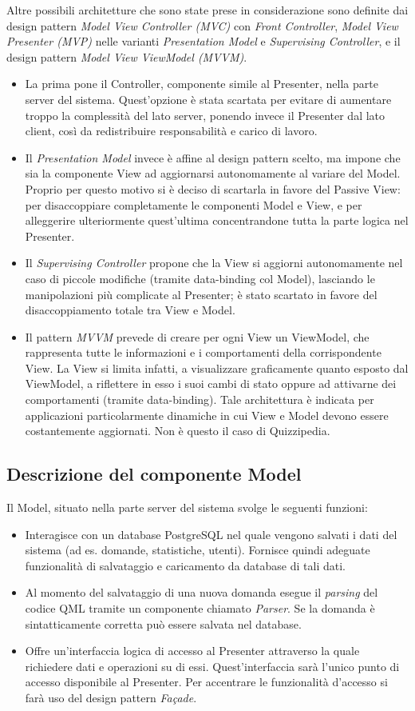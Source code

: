 \documentclass[a4paper,11pt]{article}
\begin{document}
	Altre possibili architetture che sono state prese in considerazione sono definite dai design pattern \emph{Model View Controller (MVC)} con \emph{Front Controller}, \emph{Model View Presenter (MVP)} nelle varianti \emph{Presentation Model} e \emph{Supervising Controller}, e il design pattern \emph{Model View ViewModel (MVVM)}.
	\begin{itemize}
	\item La prima pone il Controller, componente simile al Presenter, nella parte server del sistema. Quest'opzione è stata scartata per evitare di aumentare troppo la complessità del lato server, ponendo invece il Presenter dal lato client, così da redistribuire responsabilità e carico di lavoro.
	\item Il \emph{Presentation Model} invece è affine al design pattern scelto, ma impone che sia la componente View ad aggiornarsi autonomamente al variare del Model. Proprio per questo motivo si è deciso di scartarla in favore del Passive View: per disaccoppiare completamente le componenti Model e View, e per alleggerire ulteriormente quest'ultima concentrandone tutta la parte logica nel Presenter.
	\item Il \emph{Supervising Controller} propone che la View si aggiorni autonomamente nel caso di piccole modifiche (tramite data-binding col Model), lasciando le manipolazioni più complicate al Presenter; è stato scartato in favore del disaccoppiamento totale tra View e Model.
	\item Il pattern \emph{MVVM} prevede di creare per ogni View un ViewModel, che rappresenta tutte le informazioni e i comportamenti della corrispondente View. La View si limita infatti, a visualizzare graficamente quanto esposto dal ViewModel, a riflettere in esso i suoi cambi di stato oppure ad attivarne dei comportamenti (tramite data-binding). Tale architettura è indicata per applicazioni particolarmente dinamiche in cui View e Model devono essere costantemente aggiornati. Non è questo il caso di Quizzipedia.
	\end{itemize}
	\subsection{Descrizione del componente Model}
	Il Model, situato nella parte server del sistema svolge le seguenti funzioni:
	\begin{itemize}
		\item Interagisce con un database PostgreSQL nel quale vengono salvati i dati del sistema (ad es. domande, statistiche, utenti). Fornisce quindi adeguate funzionalità di salvataggio e caricamento da database di tali dati.
		\item Al momento del salvataggio di una nuova domanda esegue il \emph{parsing} del codice QML tramite un componente chiamato \emph{Parser}. Se la domanda è sintatticamente corretta può essere salvata nel database.
		\item Offre un'interfaccia logica di accesso al Presenter attraverso la quale richiedere dati e operazioni su di essi. Quest'interfaccia sarà l'unico punto di accesso disponibile al Presenter. Per accentrare le funzionalità d'accesso si farà uso del design pattern \emph{Façade}.
	\end{itemize}
\end{document}
